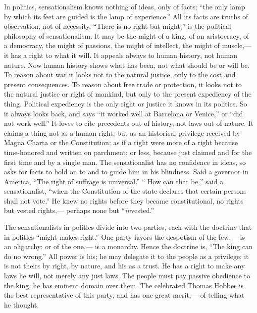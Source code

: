 \documentclass[12pt]{article}
\begin{document}
In politics, sensationalism knows nothing of ideas, only of facts; ``the only lamp by which its feet are guided is the lamp of experience.'' All its facts are truths of observation, not of necessity. ``There is no right but might,'' is the political philosophy of sensationalism. It may be the might of a king, of an aristocracy, of a democracy, the might of passions, the might of intellect, the might of muscle,--- it has a right to what it will. It appeals always to human history, not human nature. Now human history shows what has been, not what should be or will be. To reason about war it looks not to the natural justice, only to the cost and present consequences. To reason about free trade or protection, it looks not to the natural justice or right of mankind, but only to the present expediency of the thing. Political expediency is the only right or justice it knows in its politics. So it always looks back, and says ``it worked well at Barcelona or Venice,'' or ``did not work well.'' It loves to cite precedents out of history, not laws out of nature. It claims a thing not as a human right, but as an historical privilege received by Magna Charta or the Constitution; as if a right were more of a right because time-honored and written on parchment; or less, because just claimed and for the first time and by a single man. The sensationalist has no confidence in ideas, so asks for facts to hold on to and to guide him in his blindness. Said a governor in America, ``The right of suffrage is universal.'' `` How can that be,'' said a sensationalist, ``when the Constitution of the state declares that certain persons shall not vote.'' He knew no rights before they became constitutional, no rights but vested rights,--- perhaps none but ``\emph{in}vested.''

The sensationalists in politics divide into two parties, each with the doctrine that in politics ``might makes right.'' One party favors the despotism of the few,--- is an oligarchy; or of the one,--- is a monarchy. Hence the doctrine is, ``The king can do no wrong.'' All power is his; he may delegate it to the people as a privilege; it is not theirs by right, by nature, and his as a trust. He has a right to make any laws he will, not merely any just laws. The people must pay passive obedience to the king, he has eminent domain over them. The celebrated Thomas Hobbes is the best representative of this party, and has one great merit,--- of telling what he thought. 
\end{document}
